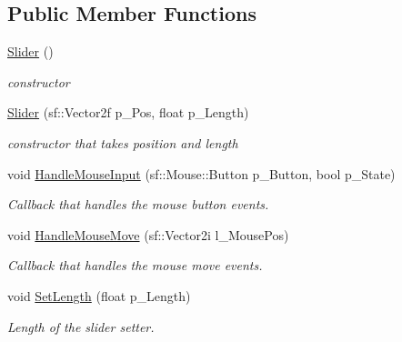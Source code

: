 \subsection*{Public Member Functions}
\begin{DoxyCompactItemize}
\item 
\mbox{\label{class_slider_a535033fada8e25ef7291d2a52e6e437b}} 
\hyperlink{class_slider_a535033fada8e25ef7291d2a52e6e437b}{Slider} ()
\begin{DoxyCompactList}\small\item\em constructor \end{DoxyCompactList}\item 
\mbox{\label{class_slider_a94344aa7908201fb6caa76d39f8bde88}} 
\hyperlink{class_slider_a94344aa7908201fb6caa76d39f8bde88}{Slider} (sf\+::\+Vector2f p\+\_\+\+Pos, float p\+\_\+\+Length)
\begin{DoxyCompactList}\small\item\em constructor that takes position and length \end{DoxyCompactList}\item 
\mbox{\label{class_slider_a0573daabd36577e4ed2364352e375c22}} 
void \hyperlink{class_slider_a0573daabd36577e4ed2364352e375c22}{Handle\+Mouse\+Input} (sf\+::\+Mouse\+::\+Button p\+\_\+\+Button, bool p\+\_\+\+State)
\begin{DoxyCompactList}\small\item\em Callback that handles the mouse button events. \end{DoxyCompactList}\item 
\mbox{\label{class_slider_aeb1da2f98fcc1ccdd71703b7e23181c7}} 
void \hyperlink{class_slider_aeb1da2f98fcc1ccdd71703b7e23181c7}{Handle\+Mouse\+Move} (sf\+::\+Vector2i l\+\_\+\+Mouse\+Pos)
\begin{DoxyCompactList}\small\item\em Callback that handles the mouse move events. \end{DoxyCompactList}\item 
\mbox{\label{class_slider_a1e57a096aedaaa37030a85aeb4e7302f}} 
void \hyperlink{class_slider_a1e57a096aedaaa37030a85aeb4e7302f}{Set\+Length} (float p\+\_\+\+Length)
\begin{DoxyCompactList}\small\item\em Length of the slider setter. \end{DoxyCompactList}\item 

\end{DoxyCompactItemize}
